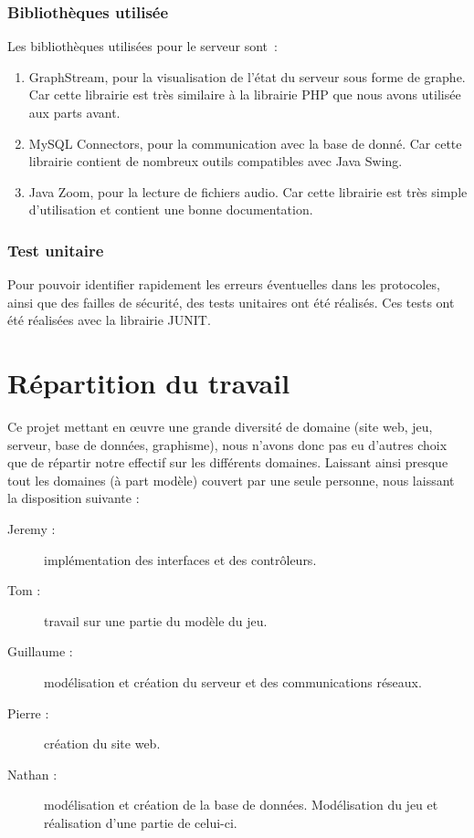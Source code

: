 \documentclass[a4paper, titlepage]{livret}
\begin{document}
\subsubsection{Bibliothèques utilisée}
Les bibliothèques utilisées pour le serveur sont :
\begin{enumerate}
  \item GraphStream, pour la visualisation de l'état du serveur sous forme de graphe. Car cette librairie est très similaire à la librairie PHP que nous avons utilisée aux parts avant.
  \item MySQL Connectors, pour la communication avec la base de donné. Car cette librairie contient de nombreux outils compatibles avec Java Swing.
  \item Java Zoom, pour la lecture de fichiers audio. Car cette librairie est très simple d’utilisation et contient une bonne documentation.
\end{enumerate}

\subsubsection{Test unitaire}
Pour pouvoir identifier rapidement les erreurs éventuelles dans les protocoles, ainsi que des failles de sécurité, des tests unitaires ont été réalisés. Ces tests ont été réalisées avec la librairie JUNIT. 


	

  \section{Répartition du travail}
    Ce projet mettant en œuvre une grande diversité de domaine (site web, jeu, serveur, base de données, graphisme), nous n'avons donc pas eu d'autres choix que de répartir notre effectif sur les différents domaines. Laissant ainsi presque tout les domaines (à part modèle) couvert par une seule personne, nous laissant la disposition suivante :
    \begin{description}
      \item[Jeremy : ] implémentation des interfaces et des contrôleurs.
      \item[Tom : ] travail sur une partie du modèle du jeu.
      \item[Guillaume :] modélisation et création du serveur et des communications réseaux.
      \item[Pierre :] création du site web.
      \item[Nathan :] modélisation et création de la base de données. Modélisation du jeu et réalisation d'une partie de celui-ci.
    \end{description}
    
\end{document}
